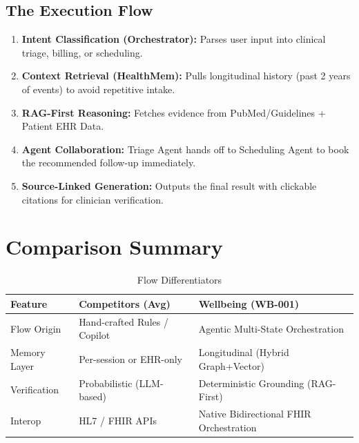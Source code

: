 \documentclass[12pt,a4paper]{article}
\begin{document}
\subsection{The Execution Flow}
\begin{enumerate}
    \item \textbf{Intent Classification (Orchestrator):} Parses user input into clinical triage, billing, or scheduling.
    \item \textbf{Context Retrieval (HealthMem):} Pulls longitudinal history (past 2 years of events) to avoid repetitive intake.
    \item \textbf{RAG-First Reasoning:} Fetches evidence from PubMed/Guidelines + Patient EHR Data.
    \item \textbf{Agent Collaboration:} Triage Agent hands off to Scheduling Agent to book the recommended follow-up immediately.
    \item \textbf{Source-Linked Generation:} Outputs the final result with clickable citations for clinician verification.
\end{enumerate}

\section{Comparison Summary}
\begin{table}[H]
\centering
\renewcommand{\arraystretch}{1.5}
\begin{tabularx}{\textwidth}{lXX}
\toprule
\textbf{Feature} & \textbf{Competitors (Avg)} & \textbf{Wellbeing (WB-001)} \\
\midrule
Flow Origin   & Hand-crafted Rules / Copilot & Agentic Multi-State Orchestration \\
Memory Layer  & Per-session or EHR-only & Longitudinal (Hybrid Graph+Vector) \\
Verification  & Probabilistic (LLM-based) & Deterministic Grounding (RAG-First) \\
Interop       & HL7 / FHIR APIs & Native Bidirectional FHIR Orchestration \\
\bottomrule
\end{tabularx}
\caption{Flow Differentiators}
\end{table}
\end{document}
